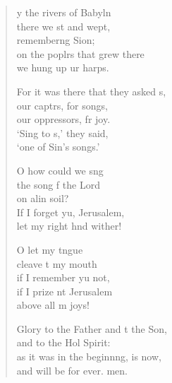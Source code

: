 \begin{verse}
  \begin{patverse}
y the rivers of Babyln\Flex\\
    there we st and wept,\Med\\
    remember\pointup{\i}ng Sion;\\
on the poplrs that grew there\Med\\
    we hung up ur harps.

For it was there that they asked s,\Flex\\
    our captrs, for songs,\Med\\
    our oppressors, fr joy.\\
‘Sing to s,’ they said,\Med\\
    ‘one of Sin’s songs.’

O how could we s\pointup{\i}ng\Flex\\
    the song f the Lord\Med\\
    on alin soil?\\
If I forget yu, Jerusalem,\Med\\
    let my right hnd wither!

O let my tngue\Flex\\
    cleave t my mouth\Med\\
    if I remember yu not,\\
if I prize nt Jerusalem\Med\\
    above all m joys!

Glory to the Father and t the Son,\Med\\
    and to the Hol Spirit:\\
as it was in the beginn\pointup{\i}ng, is now,\Med\\
    and will be for ever. men.
  \end{patverse}
\end{verse}
